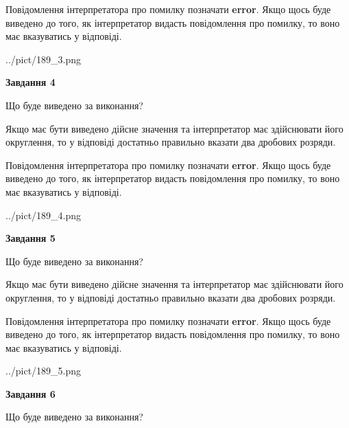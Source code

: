 \documentclass[12pt, ukrainian]{article}
\begin{document}
{\begin {Large}
Повідомлення інтерпретатора про помилку позначати \textbf{error}.
Якщо щось буде виведено до того, як інтерпретатор видасть повідомлення про помилку, 
то воно має вказуватись у відповіді. \par

\begin{center}
	{../pict/189_3.png}
\end{center}
\newpage

{\begin {center}\textbf{Завдання 4}\end {center}}\par
Що буде виведено за виконання? \par

Якщо має бути виведено дійсне значення та інтерпретатор має здійснювати його округлення, 
то у відповіді достатньо правильно вказати два дробових розряди.

Повідомлення інтерпретатора про помилку позначати \textbf{error}.
Якщо щось буде виведено до того, як інтерпретатор видасть повідомлення про помилку, 
то воно має вказуватись у відповіді. \par

\begin{center}
	{../pict/189_4.png}
\end{center}
\newpage

{\begin {center}\textbf{Завдання 5}\end {center}}\par
Що буде виведено за виконання? \par

Якщо має бути виведено дійсне значення та інтерпретатор має здійснювати його округлення, 
то у відповіді достатньо правильно вказати два дробових розряди.

Повідомлення інтерпретатора про помилку позначати \textbf{error}.
Якщо щось буде виведено до того, як інтерпретатор видасть повідомлення про помилку, 
то воно має вказуватись у відповіді. \par

\begin{center}
	{../pict/189_5.png}
\end{center}
\newpage

{\begin {center}\textbf{Завдання 6}\end {center}}\par
Що буде виведено за виконання? \par


\end{Large}}
\end{document}
